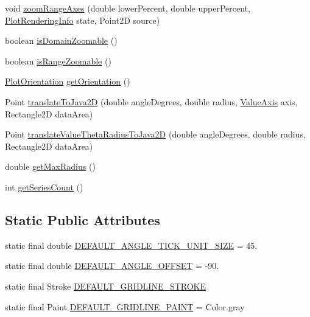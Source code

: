 \begin{DoxyCompactItemize}
\item 
void \mbox{\hyperlink{classorg_1_1jfree_1_1chart_1_1plot_1_1_polar_plot_a14b041667c009ad10d3c57b27fd677a8}{zoom\+Range\+Axes}} (double lower\+Percent, double upper\+Percent, \mbox{\hyperlink{classorg_1_1jfree_1_1chart_1_1plot_1_1_plot_rendering_info}{Plot\+Rendering\+Info}} state, Point2D source)
\item 
boolean \mbox{\hyperlink{classorg_1_1jfree_1_1chart_1_1plot_1_1_polar_plot_ad077d0e320047532577c86cc50f1ddec}{is\+Domain\+Zoomable}} ()
\item 
boolean \mbox{\hyperlink{classorg_1_1jfree_1_1chart_1_1plot_1_1_polar_plot_a82c166269eb7715eec2faa1f042616be}{is\+Range\+Zoomable}} ()
\item 
\mbox{\hyperlink{classorg_1_1jfree_1_1chart_1_1plot_1_1_plot_orientation}{Plot\+Orientation}} \mbox{\hyperlink{classorg_1_1jfree_1_1chart_1_1plot_1_1_polar_plot_a07f4e721ab3798eef43b7401d54808f7}{get\+Orientation}} ()
\item 
Point \mbox{\hyperlink{classorg_1_1jfree_1_1chart_1_1plot_1_1_polar_plot_afcb57ebcd8e1bc5a77a66ac736ebdc8c}{translate\+To\+Java2D}} (double angle\+Degrees, double radius, \mbox{\hyperlink{classorg_1_1jfree_1_1chart_1_1axis_1_1_value_axis}{Value\+Axis}} axis, Rectangle2D data\+Area)
\item 
Point \mbox{\hyperlink{classorg_1_1jfree_1_1chart_1_1plot_1_1_polar_plot_ad0a22567a58a649256966f697f2cef2d}{translate\+Value\+Theta\+Radius\+To\+Java2D}} (double angle\+Degrees, double radius, Rectangle2D data\+Area)
\item 
double \mbox{\hyperlink{classorg_1_1jfree_1_1chart_1_1plot_1_1_polar_plot_aac49cc51c62963418b44ea916f1de925}{get\+Max\+Radius}} ()
\item 
int \mbox{\hyperlink{classorg_1_1jfree_1_1chart_1_1plot_1_1_polar_plot_af848837587b2dce24308e33bbaaffa1a}{get\+Series\+Count}} ()
\end{DoxyCompactItemize}
\subsection*{Static Public Attributes}
\begin{DoxyCompactItemize}
\item 
static final double \mbox{\hyperlink{classorg_1_1jfree_1_1chart_1_1plot_1_1_polar_plot_a2abed25b19a41d5fcfcd3464f6e586af}{D\+E\+F\+A\+U\+L\+T\+\_\+\+A\+N\+G\+L\+E\+\_\+\+T\+I\+C\+K\+\_\+\+U\+N\+I\+T\+\_\+\+S\+I\+ZE}} = 45.
\item 
static final double \mbox{\hyperlink{classorg_1_1jfree_1_1chart_1_1plot_1_1_polar_plot_ae7a7c338c65d4779ff164ef05cc5d0ed}{D\+E\+F\+A\+U\+L\+T\+\_\+\+A\+N\+G\+L\+E\+\_\+\+O\+F\+F\+S\+ET}} = -\/90.
\item 
static final Stroke \mbox{\hyperlink{classorg_1_1jfree_1_1chart_1_1plot_1_1_polar_plot_afb6a6947059ff33514bae9019cf03917}{D\+E\+F\+A\+U\+L\+T\+\_\+\+G\+R\+I\+D\+L\+I\+N\+E\+\_\+\+S\+T\+R\+O\+KE}}
\item 
static final Paint \mbox{\hyperlink{classorg_1_1jfree_1_1chart_1_1plot_1_1_polar_plot_a16cb9fec5f457b171039ce6e76e365a2}{D\+E\+F\+A\+U\+L\+T\+\_\+\+G\+R\+I\+D\+L\+I\+N\+E\+\_\+\+P\+A\+I\+NT}} = Color.\+gray
\end{DoxyCompactItemize}
